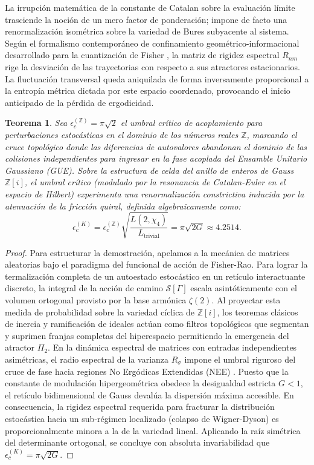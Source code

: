 \documentclass{article}
\numberwithin{equation}{section}
\theoremstyle{plain}
\newtheorem{teorema}{Teorema}[section]
\theoremstyle{definition}
\begin{document}
La irrupción matemática de la constante de Catalan sobre la evaluación límite trasciende la noción de un mero factor de ponderación; impone de facto una renormalización isométrica sobre la variedad de Bures subyacente al sistema. Según el formalismo contemporáneo de confinamiento geométrico-informacional desarrollado para la cuantización de Fisher \cite{BlumMerwin2026}, la matriz de rigidez espectral $R_{nm}$ rige la desviación de las trayectorias con respecto a sus atractores estacionarios. La fluctuación transversal queda aniquilada de forma inversamente proporcional a la entropía métrica dictada por este espacio coordenado, provocando el inicio anticipado de la pérdida de ergodicidad.

\begin{teorema}
\label{teo:acoplamiento_catalan_formal}
Sea $\epsilon_c^{(\mathbb{Z})} = \pi\sqrt{2}$ el umbral crítico de acoplamiento para perturbaciones estocásticas en el dominio de los números reales $\mathbb{Z}$, marcando el cruce topológico donde las diferencias de autovalores abandonan el dominio de las colisiones independientes para ingresar en la fase acoplada del Ensamble Unitario Gaussiano (GUE). Sobre la estructura de celda del anillo de enteros de Gauss $\mathbb{Z}[i]$, el umbral crítico (modulado por la resonancia de Catalan-Euler en el espacio de Hilbert) experimenta una renormalización constrictiva inducida por la atenuación de la fricción quiral, definida algebraicamente como:
\begin{equation}
    \epsilon_c^{(K)} = \epsilon_c^{(\mathbb{Z})} \sqrt{\frac{L(2, \chi_4)}{L_{\text{trivial}}}} = \pi \sqrt{2G} \approx 4.2514.
\end{equation}
\end{teorema}

\begin{proof}
Para estructurar la demostración, apelamos a la mecánica de matrices aleatorias bajo el paradigma del funcional de acción de Fisher-Rao. Para lograr la termalización completa de un autoestado estocástico en un retículo interactuante discreto, la integral de la acción de camino $\mathcal{S}[\Gamma]$ escala asintóticamente con el volumen ortogonal provisto por la base armónica $\zeta(2)$. Al proyectar esta medida de probabilidad sobre la variedad cíclica de $\mathbb{Z}[i]$, los teoremas clásicos de inercia y ramificación de ideales actúan como filtros topológicos que segmentan y suprimen franjas completas del hiperespacio permitiendo la emergencia del atractor $\Pi_2$.
En la dinámica espectral de matrices con entradas independientes asimétricas, el radio espectral de la varianza $R_{\sigma}$ impone el umbral riguroso del cruce de fase hacia regiones No Ergódicas Extendidas (NEE) \cite{AltErdos2021}. Puesto que la constante de modulación hipergeométrica obedece la desigualdad estricta $G < 1$, el retículo bidimensional de Gauss devalúa la dispersión máxima accesible. En consecuencia, la rigidez espectral requerida para fracturar la distribución estocástica hacia un sub-régimen localizado (colapso de Wigner-Dyson) es proporcionalmente minora a la de la variedad lineal. Aplicando la raíz simétrica del determinante ortogonal, se concluye con absoluta invariabilidad que $\epsilon_c^{(K)} = \pi\sqrt{2G}$.
\end{proof}
\end{document}
